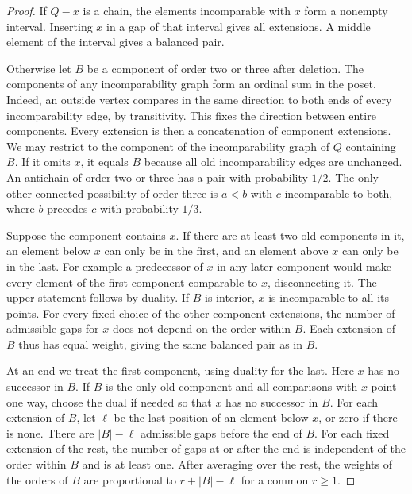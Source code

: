 \documentclass[10pt]{article}
\begin{document}
\begin{proof}
If \(Q-x\) is a chain, the elements incomparable with \(x\) form a
nonempty interval. Inserting \(x\) in a gap of that interval gives all
extensions. A middle element of the interval gives a balanced pair.

Otherwise let \(B\) be a component of order two or three after deletion.
The components of any incomparability graph form an ordinal sum in the
poset. Indeed, an outside vertex compares in the same direction to both
ends of every incomparability edge, by transitivity. This fixes the
direction between entire components. Every extension is then a
concatenation of component extensions. We may restrict to the component
of the incomparability graph of \(Q\) containing \(B\). If it omits \(x\), it
equals \(B\) because all old incomparability edges are unchanged.
An antichain of order two or three has a pair with probability \(1/2\).
The only other connected possibility of order three is \(a<b\) with
\(c\) incomparable to both, where \(b\) precedes \(c\) with probability
\(1/3\).

Suppose the component contains \(x\). If there are at least two old
components in it, an element below \(x\) can only be in the first, and
an element above \(x\) can only be in the last. For example a predecessor
of \(x\) in any later component would make every element of the first
component comparable to \(x\), disconnecting it. The upper statement
follows by duality. If \(B\) is interior, \(x\) is incomparable to all its
points. For every fixed choice of the other component extensions,
the number of admissible gaps for \(x\) does not depend on the order
within \(B\). Each extension of \(B\) thus has equal weight, giving the
same balanced pair as in \(B\).

At an end we treat the first component, using duality for the last.
Here \(x\) has no successor in \(B\). If \(B\) is the only old component
and all comparisons with \(x\) point one way, choose the dual if needed
so that \(x\) has no successor in \(B\).
For each extension of \(B\), let \(\ell\) be the last position of an
element below \(x\), or zero if there is none. There are \(|B|-\ell\)
admissible gaps before the end of \(B\). For each fixed extension of the
rest, the number of gaps at or after the end is independent of the order
within \(B\) and is at least one. After averaging over the rest, the
weights of the orders of \(B\) are proportional to \(r+|B|-\ell\) for
a common \(r\ge1\).


\end{proof}
\end{document}
